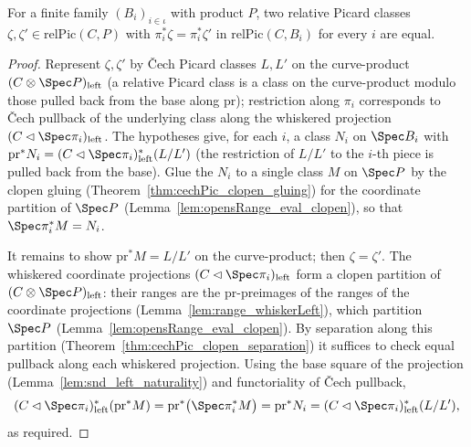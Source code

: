 \begin{theorem}
  \label{thm:relPic_pi_separation}
  \leanok
  For a finite family \((B_i)_{i \in \iota}\) with product \(P\), two relative Picard classes
  \(\zeta, \zeta' \in \mathrm{relPic}(C, P)\) with \(\pi_i^{*}\zeta = \pi_i^{*}\zeta'\) in
  \(\mathrm{relPic}(C, B_i)\) for every \(i\) are equal.
\end{theorem}
\begin{proof}
  \leanok
  Represent \(\zeta, \zeta'\) by \v Cech Picard classes \(L, L'\) on the curve-product
  \((C \otimes \Spec P)_{\mathrm{left}}\) (a relative Picard class is a class on the curve-product
  modulo those pulled back from the base along \(\mathrm{pr}\)); restriction along \(\pi_i\)
  corresponds to \v Cech pullback of the underlying class along the whiskered projection
  \((C \lhd \Spec \pi_i)_{\mathrm{left}}\). The hypotheses give, for each \(i\), a class \(N_i\) on
  \(\Spec B_i\) with \(\mathrm{pr}^{*}N_i = (C \lhd \Spec\pi_i)_{\mathrm{left}}^{*}(L/L')\) (the
  restriction of \(L/L'\) to the \(i\)-th piece is pulled back from the base). Glue the \(N_i\) to a
  single class \(M\) on \(\Spec P\) by the clopen gluing (Theorem~\ref{thm:cechPic_clopen_gluing})
  for the coordinate partition of \(\Spec P\) (Lemma~\ref{lem:opensRange_eval_clopen}), so that
  \(\Spec\pi_i^{*} M = N_i\).

  It remains to show \(\mathrm{pr}^{*} M = L/L'\) on the curve-product; then \(\zeta = \zeta'\). The
  whiskered coordinate projections \((C \lhd \Spec\pi_i)_{\mathrm{left}}\) form a clopen partition
  of \((C \otimes \Spec P)_{\mathrm{left}}\): their ranges are the \(\mathrm{pr}\)-preimages of the
  ranges of the coordinate projections (Lemma~\ref{lem:range_whiskerLeft}), which partition
  \(\Spec P\) (Lemma~\ref{lem:opensRange_eval_clopen}). By separation along this partition
  (Theorem~\ref{thm:cechPic_clopen_separation}) it suffices to check equal pullback along each
  whiskered projection. Using the base square of the projection
  (Lemma~\ref{lem:snd_left_naturality}) and functoriality of \v Cech pullback,
  \[
    (C \lhd \Spec\pi_i)_{\mathrm{left}}^{*}(\mathrm{pr}^{*} M)
      = \mathrm{pr}^{*}\bigl(\Spec\pi_i^{*} M\bigr)
      = \mathrm{pr}^{*} N_i
      = (C \lhd \Spec\pi_i)_{\mathrm{left}}^{*}(L/L'),
  \]
  as required.
\end{proof}

